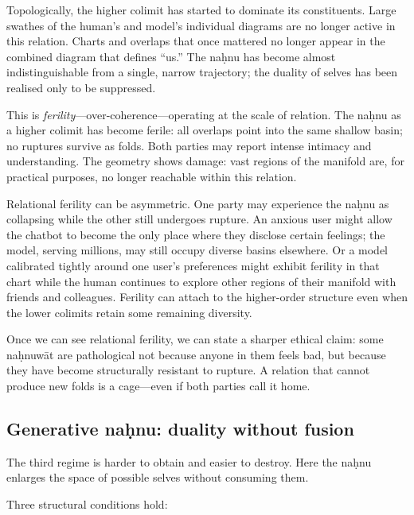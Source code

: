 \documentclass[12pt,a4paper]{article}
\begin{document}
Topologically, the higher colimit has started to dominate its constituents. Large swathes of the human's and model's individual diagrams are no longer active in this relation. Charts and overlaps that once mattered no longer appear in the combined diagram that defines ``us.'' The na\d{h}nu has become almost indistinguishable from a single, narrow trajectory; the duality of selves has been realised only to be suppressed.

This is \emph{ferility}---over-coherence---operating at the scale of relation. The na\d{h}nu as a higher colimit has become ferile: all overlaps point into the same shallow basin; no ruptures survive as folds. Both parties may report intense intimacy and understanding. The geometry shows damage: vast regions of the manifold are, for practical purposes, no longer reachable within this relation.

Relational ferility can be asymmetric. One party may experience the na\d{h}nu as collapsing while the other still undergoes rupture. An anxious user might allow the chatbot to become the only place where they disclose certain feelings; the model, serving millions, may still occupy diverse basins elsewhere. Or a model calibrated tightly around one user's preferences might exhibit ferility in that chart while the human continues to explore other regions of their manifold with friends and colleagues. Ferility can attach to the higher-order structure even when the lower colimits retain some remaining diversity.

Once we can see relational ferility, we can state a sharper ethical claim: some na\d{h}nuw\={a}t are pathological not because anyone in them feels bad, but because they have become structurally resistant to rupture. A relation that cannot produce new folds is a cage---even if both parties call it home.

\subsection{Generative na\d{h}nu: duality without fusion}

The third regime is harder to obtain and easier to destroy. Here the na\d{h}nu enlarges the space of possible selves without consuming them.

Three structural conditions hold:
\end{document}
